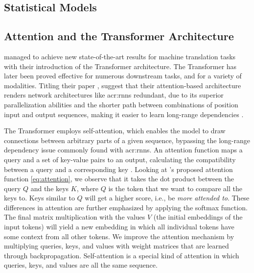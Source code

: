 \subsection{Statistical Models}


\subsection[Recurrent Neural Networks]{}


\subsection{Attention and the Transformer Architecture}
\label{subsec:attention-and-the-transformer-architecture}


\cite{vaswaniAttentionAllYou2017} managed to achieve new state-of-the-art results for machine translation tasks with their introduction of the Transformer architecture. The Transformer has later been proved effective for numerous downstream tasks, and for a variety of modalities. Titling their paper , \citeauthor{vaswaniAttentionAllYou2017} suggest that their attention-based architecture renders network architectures like \glspl{acr:rnn} redundant, due to its superior parallelization abilities and the shorter path between combinations of position input and output sequences, making it easier to learn long-range dependencies \citep[6]{vaswaniAttentionAllYou2017}.

The Transformer employs self-attention, which enables the model to draw connections between arbitrary parts of a given sequence, bypassing the long-range dependency issue commonly found with \glspl{acr:rnn}. An attention function maps a query and a set of key-value pairs to an output, calculating the compatibility between a query and a corresponding key \citep[3]{vaswaniAttentionAllYou2017}. Looking at \citeauthor{vaswaniAttentionAllYou2017}'s proposed attention function \eqref{eq:attention}, we observe that it takes the dot product between the query $Q$ and the keys $K$, where $Q$ is the token that we want to compare all the keys to. Keys similar to $Q$ will get a higher score, i.e., be \textit{more attended to}. These differences in attention are further emphasized by applying the softmax function. The final matrix multiplication with the values $V$ (the initial embeddings of the input tokens) will yield a new embedding in which all individual tokens have some context from all other tokens. We improve the attention mechanism by multiplying queries, keys, and values with weight matrices that are learned through backpropagation. Self-attention is a special kind of attention in which queries, keys, and values are all the same sequence.

